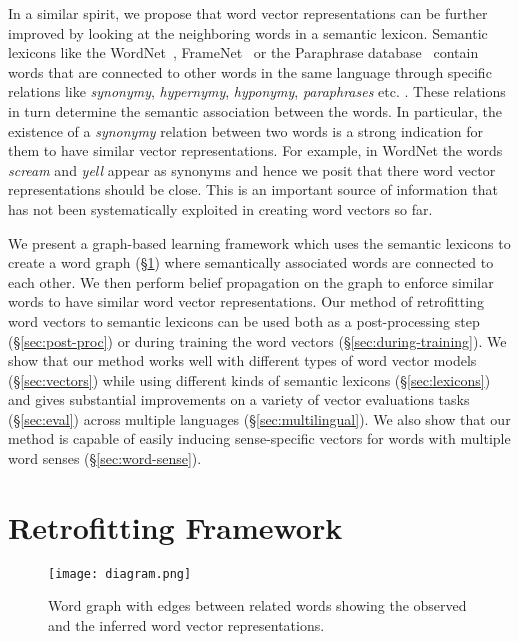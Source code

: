 \documentclass[11pt]{article}
\begin{document}
In a similar spirit, we propose that
word vector representations can be further improved by looking at the neighboring words
in a semantic lexicon. Semantic lexicons like the WordNet~\cite{miller:1995}, 
FrameNet~\cite{Baker:1998:BFP:980845.980860} or the Paraphrase 
database~\cite{ganitkevitch2013ppdb} contain words that are connected to other words in 
the same language through specific relations like \textit{synonymy}, \textit{hypernymy},
\textit{hyponymy}, \textit{paraphrases} etc. . These relations in turn determine the semantic
association between the words. In particular, the existence of a \textit{synonymy} relation 
between two words is a strong indication for them to have similar vector representations.
For example, in WordNet the words \textit{scream} and \textit{yell} appear as synonyms
and hence we posit that there word vector representations should be close. 
This is an important source of information that has not been 
systematically exploited in creating word vectors so far.

We present a graph-based learning framework which
uses the semantic lexicons to create a word graph (\S\ref{sec:framework}) 
where semantically associated words
are connected to each other. We then perform belief propagation on the graph to enforce
similar words to have similar word vector representations. Our method of 
retrofitting%
word vectors to semantic lexicons can be used both as a 
post-processing step (\S\ref{sec:post-proc}) or during training the word 
vectors (\S\ref{sec:during-training}). 
We show that our method works well with
different types of word vector models (\S\ref{sec:vectors}) 
while using different kinds of semantic lexicons (\S\ref{sec:lexicons}) 
and gives substantial improvements on a variety of vector evaluations tasks (\S\ref{sec:eval}) 
across multiple languages (\S\ref{sec:multilingual}). We also show that our method
is capable of easily inducing sense-specific vectors for words with multiple
word senses (\S\ref{sec:word-sense}).

\section{Retrofitting Framework}
\label{sec:framework}

\begin{figure}[tb]
  \centering
  \texttt{[image: diagram.png]}
  \caption{Word graph with edges between related words showing the observed and the inferred word vector representations.}
  \label{fig:word-graph}
\end{figure}
\end{document}
